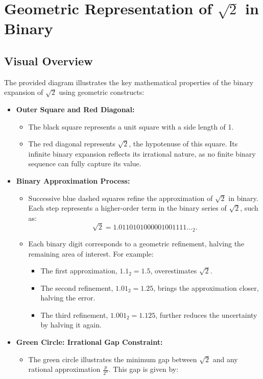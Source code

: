 \section{Geometric Representation of \texorpdfstring{$\sqrt{2}$}{sqrt(2)} in Binary}
\subsection{Visual Overview}
The provided diagram illustrates the key mathematical properties of the binary expansion of $\sqrt{2}$ using geometric constructs:

\begin{itemize}
    \item \textbf{Outer Square and Red Diagonal:}
    \begin{itemize}
        \item The black square represents a unit square with a side length of 1.
        \item The red diagonal represents $\sqrt{2}$, the hypotenuse of this square. Its infinite binary expansion reflects its irrational nature, as no finite binary sequence can fully capture its value.
    \end{itemize}
    \item \textbf{Binary Approximation Process:}
    \begin{itemize}
        \item Successive blue dashed squares refine the approximation of $\sqrt{2}$ in binary. Each step represents a higher-order term in the binary series of $\sqrt{2}$, such as:
        $$\sqrt{2} = 1.0110101000001001111\ldots_2.$$
        \item Each binary digit corresponds to a geometric refinement, halving the remaining area of interest. For example:
        \begin{itemize}
            \item The first approximation, $1.1_2 = 1.5$, overestimates $\sqrt{2}$.
            \item The second refinement, $1.01_2 = 1.25$, brings the approximation closer, halving the error.
            \item The third refinement, $1.001_2 = 1.125$, further reduces the uncertainty by halving it again.
        \end{itemize}
    \end{itemize}
    \item \textbf{Green Circle: Irrational Gap Constraint:}
    \begin{itemize}
        \item The green circle illustrates the minimum gap between $\sqrt{2}$ and any rational approximation $\frac{p}{2^n}$. This gap is given by:

\end{itemize}
\end{itemize}
